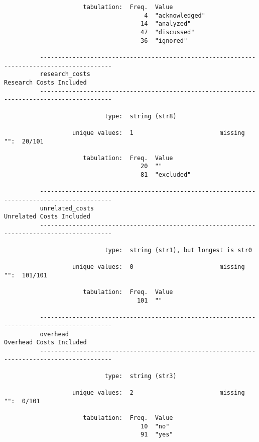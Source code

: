 \documentclass{article}
\begin{document}
\begin{verbatim}
                      tabulation:  Freq.  Value
                                       4  "acknowledged"
                                      14  "analyzed"
                                      47  "discussed"
                                      36  "ignored"
          
          ------------------------------------------------------------------------------------------
          research_costs                                                     Research Costs Included
          ------------------------------------------------------------------------------------------
          
                            type:  string (str8)
          
                   unique values:  1                        missing "":  20/101
          
                      tabulation:  Freq.  Value
                                      20  ""
                                      81  "excluded"
          
          ------------------------------------------------------------------------------------------
          unrelated_costs                                                   Unrelated Costs Included
          ------------------------------------------------------------------------------------------
          
                            type:  string (str1), but longest is str0
          
                   unique values:  0                        missing "":  101/101
          
                      tabulation:  Freq.  Value
                                     101  ""
          
          ------------------------------------------------------------------------------------------
          overhead                                                           Overhead Costs Included
          ------------------------------------------------------------------------------------------
          
                            type:  string (str3)
          
                   unique values:  2                        missing "":  0/101
          
                      tabulation:  Freq.  Value
                                      10  "no"
                                      91  "yes"
          

\end{verbatim}
\end{document}
